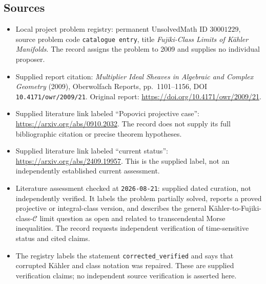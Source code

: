 \documentclass[11pt]{article}
\begin{document}
\subsection{Sources}
\begin{itemize}
\item Local project problem registry: permanent UnsolvedMath ID \(30001229\), source problem code \texttt{catalogue entry}, title \emph{Fujiki-Class Limits of K\"ahler Manifolds}. The record assigns the problem to 2009 and supplies no individual proposer.
\item Supplied report citation: \emph{Multiplier Ideal Sheaves in Algebraic and Complex Geometry} (2009), Oberwolfach Reports, pp.~1101--1156, DOI \texttt{10.4171/owr/2009/21}. Original report: \url{https://doi.org/10.4171/owr/2009/21}.
\item Supplied literature link labeled ``Popovici projective case'': \url{https://arxiv.org/abs/0910.2032}. The record does not supply its full bibliographic citation or precise theorem hypotheses.
\item Supplied literature link labeled ``current status'': \url{https://arxiv.org/abs/2409.19957}. This is the supplied label, not an independently established current assessment.
\item Literature assessment checked at \texttt{2026-08-21}: supplied dated curation, not independently verified. It labels the problem partially solved, reports a proved projective or integral-class version, and describes the general K\"ahler-to-Fujiki-class-\(\mathcal C\) limit question as open and related to transcendental Morse inequalities. The record requests independent verification of time-sensitive status and cited claims.
\item The registry labels the statement \texttt{corrected\_verified} and says that corrupted K\"ahler and class notation was repaired. These are supplied verification claims; no independent source verification is asserted here.
\end{itemize}
\end{document}
